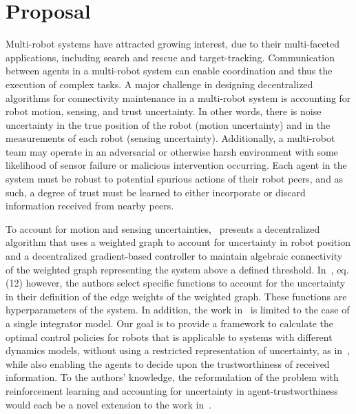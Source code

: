 \documentclass[conf]{new-aiaa}
\begin{document}
\section{Proposal}
Multi-robot systems have attracted growing interest, due to their multi-faceted applications, including search and rescue and target-tracking. Communication between agents in a multi-robot system can enable coordination and thus the execution of complex tasks. A major challenge in designing decentralized algorithms for connectivity maintenance in a multi-robot system is accounting for robot motion, sensing, and trust uncertainty. In other words, there is noise uncertainty in the true position of the robot (motion uncertainty) and in the measurements of each robot (sensing uncertainty). Additionally, a multi-robot team may operate in an adversarial or otherwise harsh environment with some likelihood of sensor failure or malicious intervention occurring. Each agent in the system must be robust to potential spurious actions of their robot peers, and as such, a degree of trust must be learned to either incorporate or discard information received from nearby peers.  

To account for motion and sensing uncertainties,~\cite{Shetty2021} presents a decentralized algorithm that uses a weighted graph to account for uncertainty in robot position and a decentralized gradient-based controller to maintain algebraic connectivity of the weighted graph representing the system above a defined threshold. In~\cite{Shetty2021}, eq.(12) however, the authors select specific functions to account for the uncertainty in their definition of the edge weights of the weighted graph. These functions are hyperparameters of the system. In addition, the work in~\cite{Shetty2021} is limited to the case of a single integrator model. Our goal is to provide a framework to calculate the optimal control policies for robots that is applicable to systems with different dynamics models, without using a restricted representation of uncertainty, as in~\cite{Shetty2021}, while also enabling the agents to decide upon the trustworthiness of received information. To the authors' knowledge, the reformulation of the problem with reinforcement learning and accounting for uncertainty in agent-trustworthiness would each be a novel extension to the work in~\cite{Shetty2021}.
\end{document}
